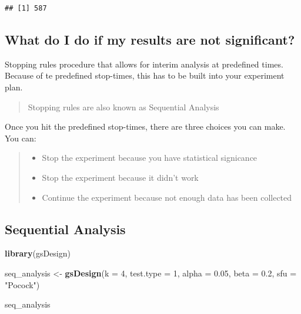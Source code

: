 \documentclass[]{article}
\newenvironment{Shaded}{\begin{snugshade}}{\end{snugshade}}
\newcommand{\KeywordTok}[1]{\textcolor[rgb]{0.13,0.29,0.53}{\textbf{#1}}}
\newcommand{\DataTypeTok}[1]{\textcolor[rgb]{0.13,0.29,0.53}{#1}}
\newcommand{\DecValTok}[1]{\textcolor[rgb]{0.00,0.00,0.81}{#1}}
\newcommand{\FloatTok}[1]{\textcolor[rgb]{0.00,0.00,0.81}{#1}}
\newcommand{\StringTok}[1]{\textcolor[rgb]{0.31,0.60,0.02}{#1}}
\newcommand{\NormalTok}[1]{#1}
\providecommand{\tightlist}{%
  \setlength{\itemsep}{0pt}\setlength{\parskip}{0pt}}
\begin{document}
\begin{verbatim}
## [1] 587
\end{verbatim}

\subsection{What do I do if my results are not
significant?}\label{what-do-i-do-if-my-results-are-not-significant}

Stopping rules procedure that allows for interim analysis at predefined
times. Because of te predefined stop-times, this has to be built into
your experiment plan.

\begin{quote}
Stopping rules are also known as Sequential Analysis
\end{quote}

Once you hit the predefined stop-times, there are three choices you can
make. You can:

\begin{quote}
\begin{itemize}
\tightlist
\item
  Stop the experiment because you have statistical signicance
\item
  Stop the experiment because it didn't work
\item
  Continue the experiment because not enough data has been collected
\end{itemize}
\end{quote}

\subsection{Sequential Analysis}\label{sequential-analysis}

\begin{Shaded}
\begin{Highlighting}[]
\KeywordTok{library}\NormalTok{(gsDesign)}

\NormalTok{seq_analysis <-}\StringTok{ }\KeywordTok{gsDesign}\NormalTok{(}\DataTypeTok{k =} \DecValTok{4}\NormalTok{, }
                         \DataTypeTok{test.type =} \DecValTok{1}\NormalTok{, }
                         \DataTypeTok{alpha =} \FloatTok{0.05}\NormalTok{, }
                         \DataTypeTok{beta =} \FloatTok{0.2}\NormalTok{, }
                         \DataTypeTok{sfu =} \StringTok{"Pocock"}\NormalTok{)}

\NormalTok{seq_analysis}
\end{Highlighting}
\end{Shaded}
\end{document}
